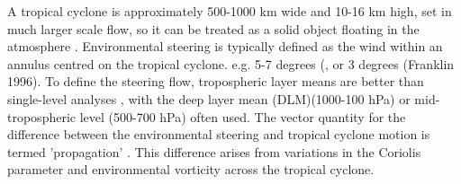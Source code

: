 





A tropical cyclone is approximately 500-1000 km wide and 10-16 km high, set in much larger scale flow, so it can be treated as a solid object floating in the atmosphere \citep{chan2005physics}. Environmental steering is typically defined as the wind within an annulus centred on the tropical cyclone. e.g. 5-7 degrees (\citep{chan1982tropical}, \citep{chan1985identification} or 3 degrees (Franklin 1996). To define the steering flow, tropospheric layer means are better than single-level analyses \citep{velden1991basic}, with the deep layer mean (DLM)(1000-100 hPa) or mid-tropospheric level (500-700 hPa) often used. The vector quantity for the difference between the environmental steering and tropical cyclone motion is termed 'propagation' \citep{carr1990observational}. This difference arises from variations in the Coriolis parameter and environmental vorticity across the tropical cyclone. 


